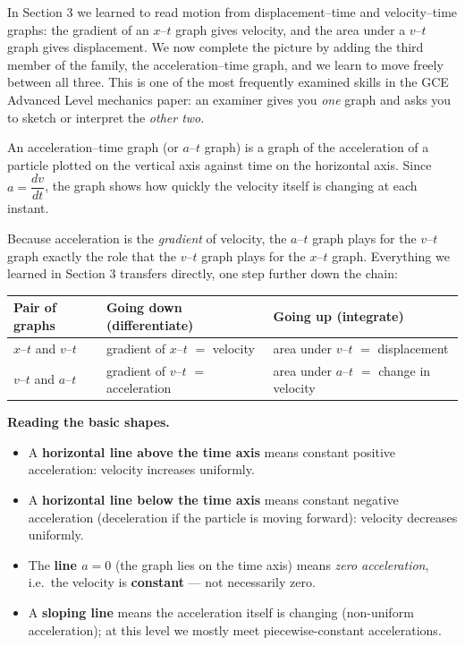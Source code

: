 \documentclass[11pt]{article}
\newcommand{\cle}[1]{{\popxbold\color{popdark}#1}}
\newcounter{popsec}
\newcounter{popsub}
\newcommand{\courssub}[1]{%
  \stepcounter{popsub}%
  \par\vspace{9pt}\noindent{\popxbold\fontsize{11.5}{13}\selectfont\color{popink}{\color{poporange}\thepopsec.\thepopsub}\hspace{6pt}#1}\par\nopagebreak\vspace{4pt}
}
\begin{document}
In Section 3 we learned to read motion from \cle{displacement--time} and \cle{velocity--time} graphs: the gradient of an $x$--$t$ graph gives velocity, and the area under a $v$--$t$ graph gives displacement. We now complete the picture by adding the third member of the family, the \cle{acceleration--time graph}, and we learn to move freely between all three. This is one of the most frequently examined skills in the GCE Advanced Level mechanics paper: an examiner gives you \emph{one} graph and asks you to sketch or interpret the \emph{other two}.

\courssub{The Acceleration--Time Graph}

\begin{definition}
An \cle{acceleration--time graph} (or $a$--$t$ graph) is a graph of the acceleration of a particle plotted on the vertical axis against time on the horizontal axis. Since $a = \dfrac{dv}{dt}$, the graph shows how quickly the velocity itself is changing at each instant.
\end{definition}

Because acceleration is the \emph{gradient} of velocity, the $a$--$t$ graph plays for the $v$--$t$ graph exactly the role that the $v$--$t$ graph plays for the $x$--$t$ graph. Everything we learned in Section 3 transfers directly, one step further down the chain:

\begin{center}
\begin{tabularx}{\linewidth}{|l|X|X|}
\hline
\rowcolor{popblueL} \textbf{Pair of graphs} & \textbf{Going down (differentiate)} & \textbf{Going up (integrate)} \\
\hline
$x$--$t$ and $v$--$t$ & gradient of $x$--$t$ $=$ velocity & area under $v$--$t$ $=$ displacement \\
\hline
$v$--$t$ and $a$--$t$ & gradient of $v$--$t$ $=$ acceleration & area under $a$--$t$ $=$ change in velocity \\
\hline
\end{tabularx}
\end{center}

\textbf{Reading the basic shapes.}\par
\begin{itemize}
\item A \textbf{horizontal line above the time axis} means \cle{constant positive acceleration}: velocity increases uniformly.
\item A \textbf{horizontal line below the time axis} means constant negative acceleration (deceleration if the particle is moving forward): velocity decreases uniformly.
\item The \textbf{line $a = 0$} (the graph lies on the time axis) means \emph{zero acceleration}, i.e.\ the velocity is \textbf{constant} --- not necessarily zero.
\item A \textbf{sloping line} means the acceleration itself is changing (non-uniform acceleration); at this level we mostly meet piecewise-constant accelerations.
\end{itemize}
\end{document}
